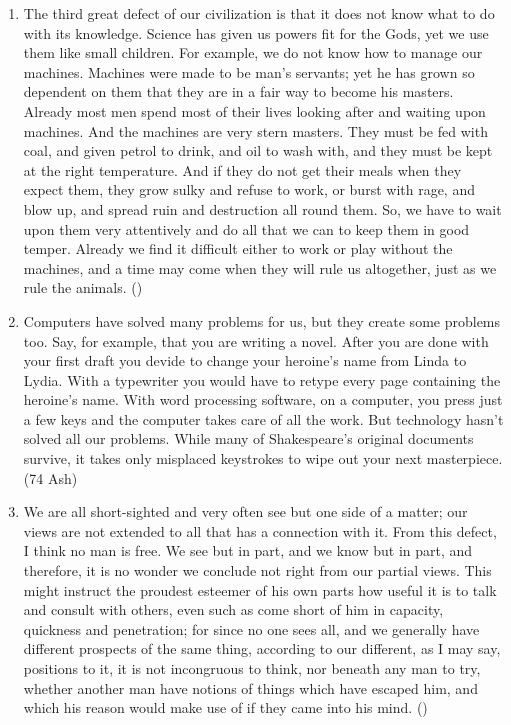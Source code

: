 \documentclass[12pt]{article}
\begin{document}
\begin{enumerate}
    \item The third great defect of our civilization is that it does not know what to do with its knowledge. Science has given us powers fit for the Gods, yet we use them like small children. For example, we do not know how to manage our machines. Machines were made to be man's servants; yet he has grown so dependent on them that they are in a fair way to become his masters. Already most men spend most of their lives looking after and waiting upon machines. And the machines are very stern masters. They must be fed with coal, and given petrol to drink, and oil to wash with, and they must be kept at the right temperature. And if they do not get their meals when they expect them, they grow sulky and refuse to work, or burst with rage, and blow up, and spread ruin and destruction all round them. So, we have to wait upon them very attentively and do all that we can to keep them in good temper. Already we find it difficult either to work or play without the machines, and a time may come when they will rule us altogether, just as we rule the animals. \hfill ()

    \item Computers have solved many problems for us, but they create some problems too. Say, for example, that you are writing a novel. After you are done with your first draft you devide to change your heroine's name from Linda to Lydia. With a typewriter you would have to retype every page containing the heroine's name. With word processing software, on a computer, you press just a few keys and the computer takes care of all the work. But technology hasn't solved all our problems. While many of Shakespeare's original documents survive, it takes only misplaced keystrokes to wipe out your next masterpiece. \hfill (74 Ash)

    \item We are all short-sighted and very often see but one side of a matter; our views are not extended to all that has a connection with it. From this defect, I think no man is free. We see but in part, and we know but in part, and therefore, it is no wonder we conclude not right from our partial views. This might instruct the proudest esteemer of his own parts how useful it is to talk and consult with others, even such as come short of him in capacity, quickness and penetration; for since no one sees all, and we generally have different prospects of the same thing, according to our different, as I may say, positions to it, it is not incongruous to think, nor beneath any man to try, whether another man have notions of things which have escaped him, and which his reason would make use of if they came into his mind. ()


\end{enumerate}
\end{document}
